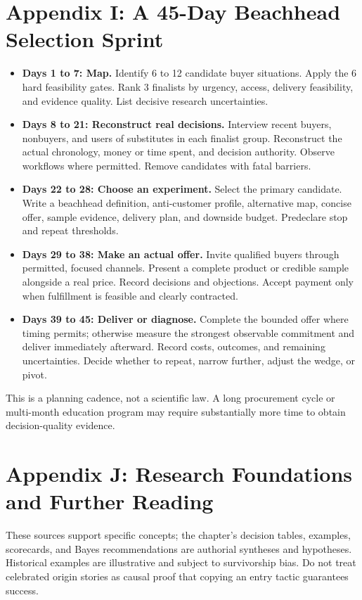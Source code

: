 \section*{Appendix I: A 45-Day Beachhead Selection Sprint}

\begin{itemize}
    \item \textbf{Days 1 to 7: Map.} Identify 6 to 12 candidate buyer situations. Apply the 6 hard feasibility gates. Rank 3 finalists by urgency, access, delivery feasibility, and evidence quality. List decisive research uncertainties.
    \item \textbf{Days 8 to 21: Reconstruct real decisions.} Interview recent buyers, nonbuyers, and users of substitutes in each finalist group. Reconstruct the actual chronology, money or time spent, and decision authority. Observe workflows where permitted. Remove candidates with fatal barriers.
    \item \textbf{Days 22 to 28: Choose an experiment.} Select the primary candidate. Write a beachhead definition, anti-customer profile, alternative map, concise offer, sample evidence, delivery plan, and downside budget. Predeclare stop and repeat thresholds.
    \item \textbf{Days 29 to 38: Make an actual offer.} Invite qualified buyers through permitted, focused channels. Present a complete product or credible sample alongside a real price. Record decisions and objections. Accept payment only when fulfillment is feasible and clearly contracted.
    \item \textbf{Days 39 to 45: Deliver or diagnose.} Complete the bounded offer where timing permits; otherwise measure the strongest observable commitment and deliver immediately afterward. Record costs, outcomes, and remaining uncertainties. Decide whether to repeat, narrow further, adjust the wedge, or pivot.
\end{itemize}

This is a planning cadence, not a scientific law. A long procurement cycle or multi-month education program may require substantially more time to obtain decision-quality evidence.

\section*{Appendix J: Research Foundations and Further Reading}

These sources support specific concepts; the chapter's decision tables, examples, scorecards, and Bayes recommendations are authorial syntheses and hypotheses. Historical examples are illustrative and subject to survivorship bias. Do not treat celebrated origin stories as causal proof that copying an entry tactic guarantees success.

